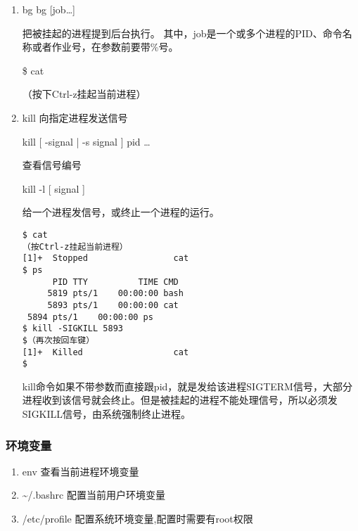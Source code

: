 \documentclass[11pt]{article}
\begin{document}
\begin{enumerate}
\item bg
\label{sec-1-1-8-5}
bg [job…]

把被挂起的进程提到后台执行。 其中，job是一个或多个进程的PID、命令名称或者作业号，在参数前要带\%号。 

\$ cat

（按下Ctrl-z挂起当前进程）

\item kill
\label{sec-1-1-8-6}
向指定进程发送信号

kill [ -signal | -s signal ] pid \ldots{}

查看信号编号

kill -l  [ signal ]

给一个进程发信号，或终止一个进程的运行。 

\begin{verbatim}
$ cat
（按Ctrl-z挂起当前进程）
[1]+  Stopped                 cat
$ ps
      PID TTY          TIME CMD
     5819 pts/1    00:00:00 bash
     5893 pts/1    00:00:00 cat
 5894 pts/1    00:00:00 ps
$ kill -SIGKILL 5893
$（再次按回车键）
[1]+  Killed                  cat
$
\end{verbatim}

kill命令如果不带参数而直接跟pid，就是发给该进程SIGTERM信号，大部分进程收到该信号就会终止。但是被挂起的进程不能处理信号，所以必须发SIGKILL信号，由系统强制终止进程。
\end{enumerate}
\subsubsection{环境变量}
\label{sec-1-1-9}
\begin{enumerate}
\item env
\label{sec-1-1-9-1}
查看当前进程环境变量
\item \textasciitilde{}/.bashrc
\label{sec-1-1-9-2}
配置当前用户环境变量
\item /etc/profile
\label{sec-1-1-9-3}
配置系统环境变量,配置时需要有root权限
\end{enumerate}
\end{document}
